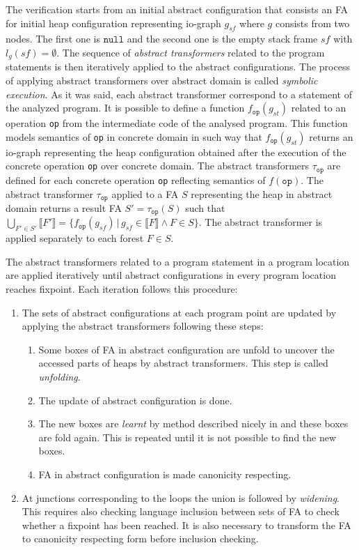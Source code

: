 The verification starts from an initial abstract configuration that consists an FA for initial heap configuration representing io-graph
$g_{\mathit{sf}}$ where $g$ consists from two nodes.
The first one is $\texttt{null}$ and the second one is the empty stack frame $sf$ with $l_g(\mathit{sf}) = \emptyset$.
The sequence of \emph{abstract transformers} related to the program statements is then iteratively applied to the abstract configurations.
The process of applying abstract transformers over abstract domain is called \emph{symbolic execution}.
As it was said, each abstract transformer correspond to a statement of the analyzed program.
It is possible to define a function $f_{\texttt{op}}(g_{st})$ related to an operation \texttt{op} from the intermediate code of the analysed program.
This function models semantics of \texttt{op} in concrete domain in such way that $f_{\texttt{op}}(g_{\mathit{st}})$
returns an io-graph representing the heap configuration obtained after the execution of
the concrete operation \texttt{op} over concrete domain.
The abstract transformers $\tau_{\texttt{op}}$ are defined for each concrete
operation \texttt{op} reflecting semantics of $f(\texttt{op})$.
The abstract transformer $\tau_{\texttt{op}}$ applied to a FA $S$
representing the heap in abstract domain returns a result FA $S' = \tau_{\texttt{op}}(S)$
such that $\bigcup_{F' \in S'} \llbracket F' \rrbracket = \{ f_{\texttt{op}}(g_{sf}) \,|\, g_{sf} \in \llbracket F \rrbracket \wedge F \in S \}$.
The abstract transformer is applied separately to each forest $F \in S$.

The abstract transformers related to a program statement in a program location are applied iteratively until
abstract configurations in every program location reaches fixpoint.
Each iteration follows this procedure:
\begin{enumerate}
		\item The sets of abstract configurations at each program point are updated by applying
			the abstract transformers following these steps:
			\begin{enumerate}
				\item Some boxes of FA in abstract configuration are unfold to uncover the accessed parts of heaps by abstract transformers.
					This step is called \emph{unfolding}.
				\item The update of abstract configuration is done.
				\item The new boxes are \emph{learnt} by method described nicely in \cite{forester13}
					and these boxes are fold again.
					This is repeated until it is not possible to find the new boxes.
				\item FA in abstract configuration is made canonicity respecting.
			\end{enumerate}
		\item At junctions corresponding to the loops the union is followed by \emph{widening}.
			This requires also checking language inclusion between sets
			of FA to check whether a fixpoint has been reached.
			It is also necessary to transform the FA to canonicity
			respecting form before inclusion checking.
\end{enumerate}

